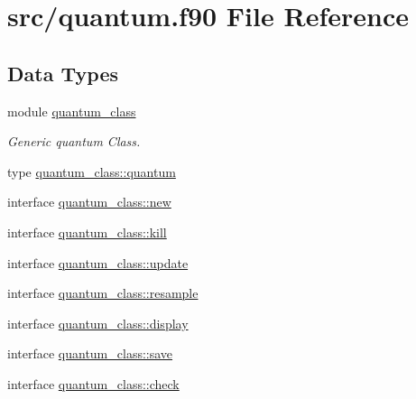 \hypertarget{quantum_8f90}{\section{src/quantum.f90 File Reference}
\label{quantum_8f90}
}
\subsection*{Data Types}
\begin{DoxyCompactItemize}
\item 
module \hyperlink{classquantum__class}{quantum\-\_\-class}
\begin{DoxyCompactList}\small\item\em Generic quantum Class. \end{DoxyCompactList}\item 
type \hyperlink{structquantum__class_1_1quantum}{quantum\-\_\-class\-::quantum}
\item 
interface \hyperlink{interfacequantum__class_1_1new}{quantum\-\_\-class\-::new}
\item 
interface \hyperlink{interfacequantum__class_1_1kill}{quantum\-\_\-class\-::kill}
\item 
interface \hyperlink{interfacequantum__class_1_1update}{quantum\-\_\-class\-::update}
\item 
interface \hyperlink{interfacequantum__class_1_1resample}{quantum\-\_\-class\-::resample}
\item 
interface \hyperlink{interfacequantum__class_1_1display}{quantum\-\_\-class\-::display}
\item 
interface \hyperlink{interfacequantum__class_1_1save}{quantum\-\_\-class\-::save}
\item 
interface \hyperlink{interfacequantum__class_1_1check}{quantum\-\_\-class\-::check}
\end{DoxyCompactItemize}

